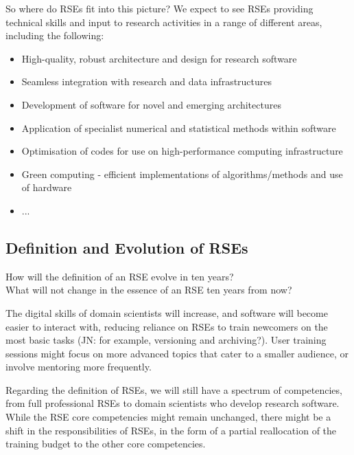 \documentclass{eceasst}
\begin{document}
So where do RSEs fit into this picture? We expect to see RSEs providing technical skills and input
to research activities in a range of different areas, including the following:
\begin{itemize}
  \item High-quality, robust architecture and design for research software
  \item Seamless integration with research and data infrastructures
  \item Development of software for novel and emerging architectures
  \item Application of specialist numerical and statistical methods within software
  \item Optimisation of codes for use on high-performance computing infrastructure
  \item Green computing - efficient implementations of algorithms/methods and use of hardware
  \item ...
\end{itemize}

\subsection{Definition and Evolution of RSEs}
\begin{framed}
\hfill How will the definition of an RSE evolve in ten years?\\

\hfill What will not change in the essence of an RSE ten years from now?
\end{framed}

The digital skills of domain scientists will increase,
and software will become easier to interact with,
reducing reliance on RSEs to train newcomers on the most basic tasks
(JN: for example, versioning and archiving?).
User training sessions might focus on more advanced topics
that cater to a smaller audience, or involve mentoring more frequently.

Regarding the definition of RSEs, we will still have a spectrum of competencies,
from full professional RSEs to domain scientists who develop research software.
While the RSE core competencies\cite{Goth2024} might remain unchanged,
there might be a shift in the responsibilities of RSEs,
in the form of a partial reallocation of the training budget
to the other core competencies.
\end{document}
